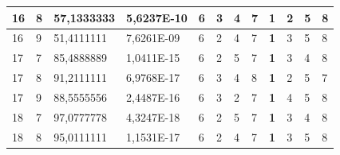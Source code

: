 \documentclass[conference]{IEEEtran}
\begin{document}
\begin{table}[]
\begin{tabular}{|llll|llllllll|}
		\multicolumn{1}{|l|}{16}  & \multicolumn{1}{l|}{8}         & \multicolumn{1}{l|}{57,1333333}    & 5,6237E-10 & \multicolumn{1}{l|}{6}   & \multicolumn{1}{l|}{3}          & \multicolumn{1}{l|}{4}          & \multicolumn{1}{l|}{7}   & \multicolumn{1}{l|}{\textbf{1}} & \multicolumn{1}{l|}{2}          & \multicolumn{1}{l|}{5}          & 8                      \\ \hline
		\multicolumn{1}{|l|}{16}  & \multicolumn{1}{l|}{9}         & \multicolumn{1}{l|}{51,4111111}    & 7,6261E-09 & \multicolumn{1}{l|}{6}   & \multicolumn{1}{l|}{2}          & \multicolumn{1}{l|}{4}          & \multicolumn{1}{l|}{7}   & \multicolumn{1}{l|}{\textbf{1}} & \multicolumn{1}{l|}{3}          & \multicolumn{1}{l|}{5}          & 8                      \\ \hline
		\multicolumn{1}{|l|}{17}  & \multicolumn{1}{l|}{7}         & \multicolumn{1}{l|}{85,4888889}    & 1,0411E-15 & \multicolumn{1}{l|}{6}   & \multicolumn{1}{l|}{2}          & \multicolumn{1}{l|}{5}          & \multicolumn{1}{l|}{7}   & \multicolumn{1}{l|}{\textbf{1}} & \multicolumn{1}{l|}{3}          & \multicolumn{1}{l|}{4}          & 8                      \\ \hline
		\multicolumn{1}{|l|}{17}  & \multicolumn{1}{l|}{8}         & \multicolumn{1}{l|}{91,2111111}    & 6,9768E-17 & \multicolumn{1}{l|}{6}   & \multicolumn{1}{l|}{3}          & \multicolumn{1}{l|}{4}          & \multicolumn{1}{l|}{8}   & \multicolumn{1}{l|}{\textbf{1}} & \multicolumn{1}{l|}{2}          & \multicolumn{1}{l|}{5}          & 7                      \\ \hline
		\multicolumn{1}{|l|}{17}  & \multicolumn{1}{l|}{9}         & \multicolumn{1}{l|}{88,5555556}    & 2,4487E-16 & \multicolumn{1}{l|}{6}   & \multicolumn{1}{l|}{3}          & \multicolumn{1}{l|}{2}          & \multicolumn{1}{l|}{7}   & \multicolumn{1}{l|}{\textbf{1}} & \multicolumn{1}{l|}{4}          & \multicolumn{1}{l|}{5}          & 8                      \\ \hline
		\multicolumn{1}{|l|}{18}  & \multicolumn{1}{l|}{7}         & \multicolumn{1}{l|}{97,0777778}    & 4,3247E-18 & \multicolumn{1}{l|}{6}   & \multicolumn{1}{l|}{2}          & \multicolumn{1}{l|}{5}          & \multicolumn{1}{l|}{7}   & \multicolumn{1}{l|}{\textbf{1}} & \multicolumn{1}{l|}{3}          & \multicolumn{1}{l|}{4}          & 8                      \\ \hline
		\multicolumn{1}{|l|}{18}  & \multicolumn{1}{l|}{8}         & \multicolumn{1}{l|}{95,0111111}    & 1,1531E-17 & \multicolumn{1}{l|}{6}   & \multicolumn{1}{l|}{2}          & \multicolumn{1}{l|}{4}          & \multicolumn{1}{l|}{7}   & \multicolumn{1}{l|}{\textbf{1}} & \multicolumn{1}{l|}{3}          & \multicolumn{1}{l|}{5}          & 8                      \\ \hline

\end{tabular}
\end{table}
\end{document}
